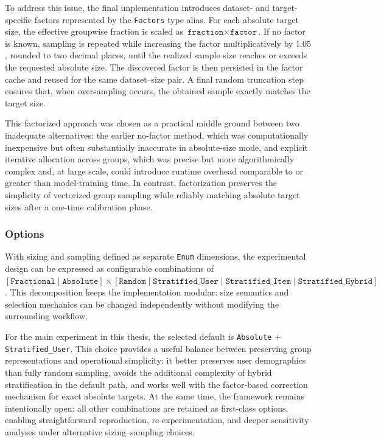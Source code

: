 \documentclass[12pt,a4paper]{article}
\begin{document}
To address this issue, the final implementation introduces dataset- and target-specific factors represented by the \texttt{Factors} type alias. For each absolute target size, the effective groupwise fraction is scaled as \(\texttt{fraction} \times \texttt{factor}\). If no factor is known, sampling is repeated while increasing the factor multiplicatively by \(1.05\), rounded to two decimal places, until the realized sample size reaches or exceeds the requested absolute size. The discovered factor is then persisted in the factor cache and reused for the same dataset--size pair. A final random truncation step ensures that, when oversampling occurs, the obtained sample exactly matches the target size.

This factorized approach was chosen as a practical middle ground between two inadequate alternatives: the earlier no-factor method, which was computationally inexpensive but often substantially inaccurate in absolute-size mode, and explicit iterative allocation across groups, which was precise but more algorithmically complex and, at large scale, could introduce runtime overhead comparable to or greater than model-training time. In contrast, factorization preserves the simplicity of vectorized group sampling while reliably matching absolute target sizes after a one-time calibration phase.

\subsubsection{Options}
With sizing and sampling defined as separate \texttt{Enum} dimensions, the experimental design can be expressed as configurable combinations of \([\texttt{Fractional} \mid \texttt{Absolute}] \times [\texttt{Random} \mid \texttt{Stratified\_User} \mid \texttt{Stratified\_Item} \mid \texttt{Stratified\_Hybrid}]\). This decomposition keeps the implementation modular: size semantics and selection mechanics can be changed independently without modifying the surrounding workflow.

For the main experiment in this thesis, the selected default is \texttt{Absolute} + \texttt{Stratified\_User}. This choice provides a useful balance between preserving group representations and operational simplicity: it better preserves user demographics than fully random sampling, avoids the additional complexity of hybrid stratification in the default path, and works well with the factor-based correction mechanism for exact absolute targets. At the same time, the framework remains intentionally open: all other combinations are retained as first-class options, enabling straightforward reproduction, re-experimentation, and deeper sensitivity analyses under alternative sizing--sampling choices.
\end{document}
